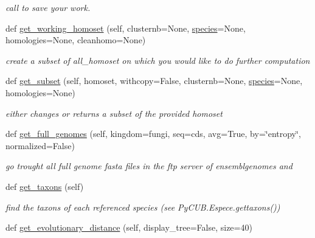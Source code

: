\begin{DoxyCompactItemize}
\begin{DoxyCompactList}\small\item\em call to save your work. \end{DoxyCompactList}\item 
def \mbox{\hyperlink{class_py_c_u_b_1_1py_c_u_b_1_1_py_c_u_b_a1916ef696d74af1028a2aeff643727db}{get\+\_\+working\+\_\+homoset}} (self, clusternb=None, \mbox{\hyperlink{class_py_c_u_b_1_1py_c_u_b_1_1_py_c_u_b_a60cc232d3d52f88fe8a80244b3fcddc8}{species}}=None, homologies=None, cleanhomo=None)
\begin{DoxyCompactList}\small\item\em create a subset of all\+\_\+homoset on which you would like to do further computation \end{DoxyCompactList}\item 
def \mbox{\hyperlink{class_py_c_u_b_1_1py_c_u_b_1_1_py_c_u_b_a9fab964d44e03b46d330b3754f5c39fb}{get\+\_\+subset}} (self, homoset, withcopy=False, clusternb=None, \mbox{\hyperlink{class_py_c_u_b_1_1py_c_u_b_1_1_py_c_u_b_a60cc232d3d52f88fe8a80244b3fcddc8}{species}}=None, homologies=None)
\begin{DoxyCompactList}\small\item\em either changes or returns a subset of the provided homoset \end{DoxyCompactList}\item 
def \mbox{\hyperlink{class_py_c_u_b_1_1py_c_u_b_1_1_py_c_u_b_a53b60adfafbe019421d010c5fed04f5c}{get\+\_\+full\+\_\+genomes}} (self, kingdom=\textquotesingle{}fungi\textquotesingle{}, seq=\textquotesingle{}cds\textquotesingle{}, avg=True, by=\char`\"{}entropy\char`\"{}, normalized=False)
\begin{DoxyCompactList}\small\item\em go trought all full genome fasta files in the ftp server of ensemblgenomes and \end{DoxyCompactList}\item 
def \mbox{\hyperlink{class_py_c_u_b_1_1py_c_u_b_1_1_py_c_u_b_a4e9a2d43aacfc8d2fb1610140f2439f2}{get\+\_\+taxons}} (self)
\begin{DoxyCompactList}\small\item\em find the taxons of each referenced species (see Py\+C\+U\+B.\+Espece.\+gettaxons()) \end{DoxyCompactList}\item 
def \mbox{\hyperlink{class_py_c_u_b_1_1py_c_u_b_1_1_py_c_u_b_af0d7bed125f4437bea6b8051f9922c1d}{get\+\_\+evolutionary\+\_\+distance}} (self, display\+\_\+tree=False, size=40)

\end{DoxyCompactItemize}
